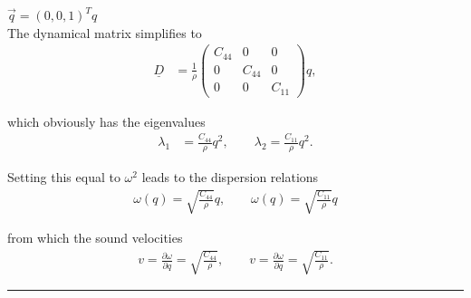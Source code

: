 \documentclass{article}
\begin{document}
{	 $\vec{q} = (0,0,1)^T q$\\
	The dynamical matrix simplifies to
		\begin{align*}
			\underline{D} &= \frac{1}{\rho}
			\begin{pmatrix}
				C_{44} & 0 & 0 \\
				0 & C_{44} & 0 \\
				0 & 0 & C_{11}
			\end{pmatrix}
			q,
		\end{align*}
	
	which obviously has the eigenvalues
		\begin{align*}
			\lambda_1 &= \frac{C_{44}}{\rho}q^2, \qquad \lambda_2 = \frac{C_{11}}{\rho}q^2.
		\end{align*}
	
	Setting this equal to $\omega^2$ leads to the dispersion relations
		\begin{align*}
			\omega(q) = \sqrt{\frac{C_{44}}{\rho}}q, \qquad \omega(q) = \sqrt{\frac{C_{11}}{\rho}}q
		\end{align*}
	
	from which the sound velocities
		\begin{align*}
			v = \frac{\partial\omega}{\partial q} = \sqrt{\frac{C_{44}}{\rho}}, \qquad v = \frac{\partial\omega}{\partial q} = \sqrt{\frac{C_{11}}{\rho}}.
		\end{align*}
\hrule
}


\newpage
\end{document}

